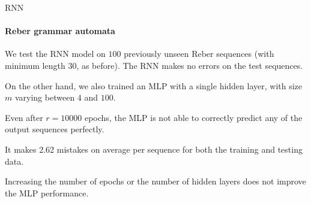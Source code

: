 \begin{frame}{RNN}
\framesubtitle{Reber grammar automata}


    We test the RNN model on $100$ previously unseen Reber
    sequences (with minimum length 30, as before). The RNN makes no
    errors on the test sequences. 

	\medskip

	On the other hand, we also trained an
    MLP with a single hidden layer, with size $m$ varying between $4$
    and $100$. 

\medskip


Even after $r=10000$ epochs, the MLP is not able to
    correctly predict any of the output sequences perfectly.

	\medskip

	It makes
    2.62 mistakes on average per sequence for both the training and
    testing data.

	\medskip

	Increasing the number of epochs or the number of
    hidden layers does not improve the MLP performance.
\end{frame}
%
